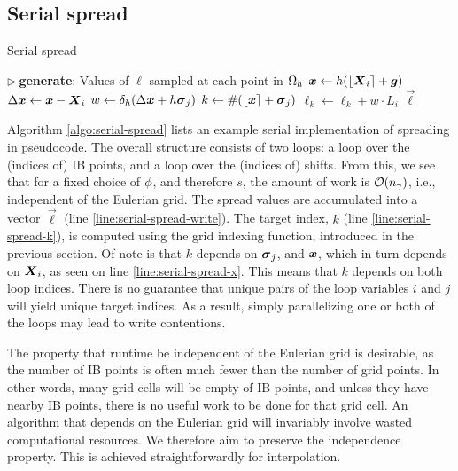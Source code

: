 \subsection{Serial spread}

\begin{algorithm}
\caption{Serial spread}
\label{algo:serial-spread}
\begin{algorithmic}[1]
\State $\triangleright\ $\textbf{generate}: Values of $\ell$ sampled at each point in $\Omega_h$
    \State $\boldsymbol{x} \gets h(\left\lfloor{\boldsymbol{X}_i}\right\rceil+\boldsymbol{g})$\label{line:serial-spread-x}
    \State $\Delta\boldsymbol{x} \gets \boldsymbol{x}-\boldsymbol{X}_i$
        \State $w \gets \delta_h(\Delta\boldsymbol{x}+h\boldsymbol{\sigma}_j)$
        \State $k \gets \#(\left\lfloor{\boldsymbol{x}}\right\rceil + \boldsymbol{\sigma}_j)$ \label{line:serial-spread-k}
            \State $\ell_k \gets \ell_k + w \cdot L_i$ \label{line:serial-spread-write}
        \EndIf
    \EndFor
\EndFor
\State \Return $\vec{\ell}$
\EndProcedure
\end{algorithmic}
\end{algorithm}

Algorithm \ref{algo:serial-spread} lists an example serial implementation of spreading in
pseudocode. The overall structure consists of two loops: a loop over the (indices of)
IB points, and a loop over the (indices of) shifts. From this, we see that for a fixed
choice of $\phi$, and therefore $s$, the amount of work is $\mathcal{O}({n_\gamma})$, i.e.,
independent of the Eulerian grid. The spread values are accumulated into a vector
$\vec{\ell}$ (line \ref{line:serial-spread-write}). The target index, $k$ (line
\ref{line:serial-spread-k}), is computed using the grid indexing function, introduced in
the previous section. Of note is that $k$ depends on $\boldsymbol{\sigma}_j$, and $\boldsymbol{x}$, which in turn
depends on $\boldsymbol{X}_i$, as seen on line \ref{line:serial-spread-x}. This means that $k$
depends on both loop indices. There is no guarantee that unique pairs of the loop
variables $i$ and $j$ will yield unique target indices. As a result, simply parallelizing
one or both of the loops may lead to write contentions.

The property that runtime be independent of the Eulerian grid is desirable, as the
number of IB points is often much fewer than the number of grid points. In other words,
many grid cells will be empty of IB points, and unless they have nearby IB points, there
is no useful work to be done for that grid cell. An algorithm that depends on the
Eulerian grid will invariably involve wasted computational resources. We therefore aim to
preserve the independence property. This is achieved straightforwardly for interpolation.


